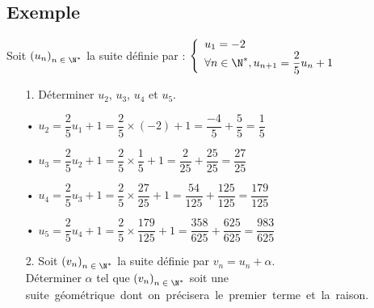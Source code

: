\subsection{Exemple } 


Soit $\left(u_n\right)_{n\; \in \; \N^*}$ la suite définie par : $\left\{
  \begin{array}{lll}
    u_1 = -2 \\
    \forall n \in \N^*, u_{n+1} = \dfrac{2}{5}u_n + 1
  \end{array}
\right.$

\begin{itemize}
\item[1.] Déterminer $u_2$, $u_3$, $u_4$ et $u_5$. \\
\end{itemize}

\begin{itemize}
\item[•] $u_2 = \dfrac{2}{5}u_1 + 1 = \dfrac{2}{5} \times \left(-2\right) + 1 = \dfrac{-4}{5} + \dfrac{5}{5} = \dfrac{1}{5}$ \vspace*{.3cm} \\
\item[•] $u_3 = \dfrac{2}{5}u_2 + 1 = \dfrac{2}{5} \times \dfrac{1}{5} + 1 = \dfrac{2}{25} + \dfrac{25}{25} = \dfrac{27}{25}$ \vspace*{.3cm} \\
\item[•] $u_4 = \dfrac{2}{5}u_3 + 1 = \dfrac{2}{5} \times \dfrac{27}{25} + 1 = \dfrac{54}{125} + \dfrac{125}{125} = \dfrac{179}{125}$ \vspace*{.3cm} \\
\item[•] $u_5 = \dfrac{2}{5}u_4 + 1 = \dfrac{2}{5} \times \dfrac{179}{125} + 1 = \dfrac{358}{625} + \dfrac{625}{625} = \dfrac{983}{625}$ \\
\end{itemize}

\vspace*{.3cm}

\begin{itemize}
\item[2.] Soit $\left(v_n\right)_{n\; \in \; \N^*}$ la suite définie par $v_n =u_n + \alpha$. \\ Déterminer $\alpha$ tel que $\left(v_n\right)_{n\; \in \; \N^*}$ soit une \hbox{suite géométrique dont on précisera le premier terme et la raison.}
\end{itemize}

